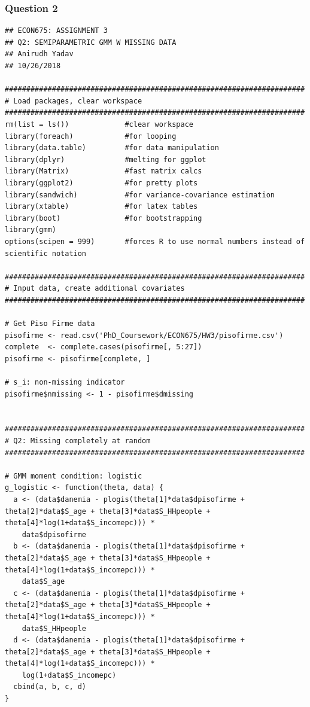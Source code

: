 \documentclass[12pt]{article}
\begin{document}
\subsubsection{Question 2}
\begin{verbatim}
## ECON675: ASSIGNMENT 3
## Q2: SEMIPARAMETRIC GMM W MISSING DATA
## Anirudh Yadav 
## 10/26/2018

######################################################################
# Load packages, clear workspace
######################################################################
rm(list = ls())             #clear workspace
library(foreach)            #for looping
library(data.table)         #for data manipulation
library(dplyr)              #melting for ggplot
library(Matrix)             #fast matrix calcs
library(ggplot2)            #for pretty plots
library(sandwich)           #for variance-covariance estimation 
library(xtable)             #for latex tables
library(boot)               #for bootstrapping
library(gmm)
options(scipen = 999)       #forces R to use normal numbers instead of scientific notation

######################################################################
# Input data, create additional covariates
######################################################################

# Get Piso Firme data
pisofirme <- read.csv('PhD_Coursework/ECON675/HW3/pisofirme.csv')
complete  <- complete.cases(pisofirme[, 5:27])
pisofirme <- pisofirme[complete, ] 

# s_i: non-missing indicator
pisofirme$nmissing <- 1 - pisofirme$dmissing


######################################################################
# Q2: Missing completely at random
######################################################################

# GMM moment condition: logistic
g_logistic <- function(theta, data) {
  a <- (data$danemia - plogis(theta[1]*data$dpisofirme + theta[2]*data$S_age + theta[3]*data$S_HHpeople + theta[4]*log(1+data$S_incomepc))) * 
    data$dpisofirme
  b <- (data$danemia - plogis(theta[1]*data$dpisofirme + theta[2]*data$S_age + theta[3]*data$S_HHpeople + theta[4]*log(1+data$S_incomepc))) * 
    data$S_age
  c <- (data$danemia - plogis(theta[1]*data$dpisofirme + theta[2]*data$S_age + theta[3]*data$S_HHpeople + theta[4]*log(1+data$S_incomepc))) * 
    data$S_HHpeople
  d <- (data$danemia - plogis(theta[1]*data$dpisofirme + theta[2]*data$S_age + theta[3]*data$S_HHpeople + theta[4]*log(1+data$S_incomepc))) * 
    log(1+data$S_incomepc)
  cbind(a, b, c, d)
}


\end{verbatim}
\end{document}
